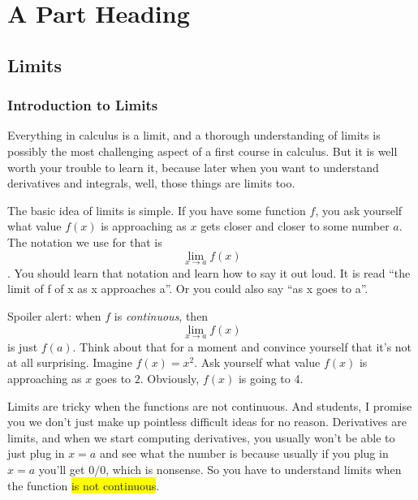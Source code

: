 \documentclass[11pt]{book}
\newcommand{\hilight}[1]{\colorbox{yellow}{#1}}
\numberwithin{example}{chapter}
\begin{document}
\clearpage






\tableofcontents                        %








\mainmatter                             %


\part{A Part Heading}                   %



\chapter{Limits}     

\section{Introduction to Limits}

Everything in calculus is a limit, and a thorough understanding of limits is possibly the most challenging aspect of a first course in calculus.  But it is well worth your trouble to learn it, because later when you want to understand derivatives and integrals, well, those things are limits too.  

The basic idea of limits is simple.  If you have some function $f$, you ask yourself what value $f(x)$ is approaching as $x$ gets closer and closer to some number $a$.  The notation we use for that is $$\lim_{x\to a} f(x)$$.  You should learn that notation and learn how to say it out loud.  It is read ``the limit of f of x as x approaches a''.  Or you could also say ``as x goes to a''.  

Spoiler alert: when $f$ is \emph{continuous}, then $$\lim_{x\to a} f(x)$$ is just $f(a)$.  Think about that for a moment and convince yourself that it's not at all surprising.  Imagine $f(x)=x^2$.  Ask yourself what value $f(x)$ is approaching as $x$ goes to $2$.  Obviously, $f(x)$ is going to 4.

Limits are tricky when the functions are not continuous.  And students, I promise you we don't just make up pointless difficult ideas for no reason.  Derivatives are limits, and when we start computing derivatives, you usually won't be able to just plug in $x=a$ and see what the number is because usually if you plug in $x=a$ you'll get $0/0$, which is nonsense.  So you have to understand limits when the function \hilight{is not continuous}.
\end{document}
